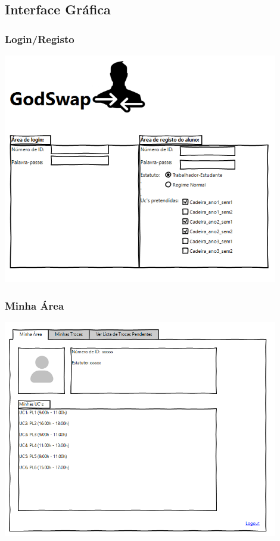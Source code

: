 \documentclass[a4paper]{article}
\begin{document}
\subsection{Interface Gráfica}

\subsubsection{Login/Registo}
\includegraphics[width=12cm]{interface_1}\break

\subsubsection{Minha Área}
\includegraphics[width=12cm]{interface_2}\break
\end{document}
